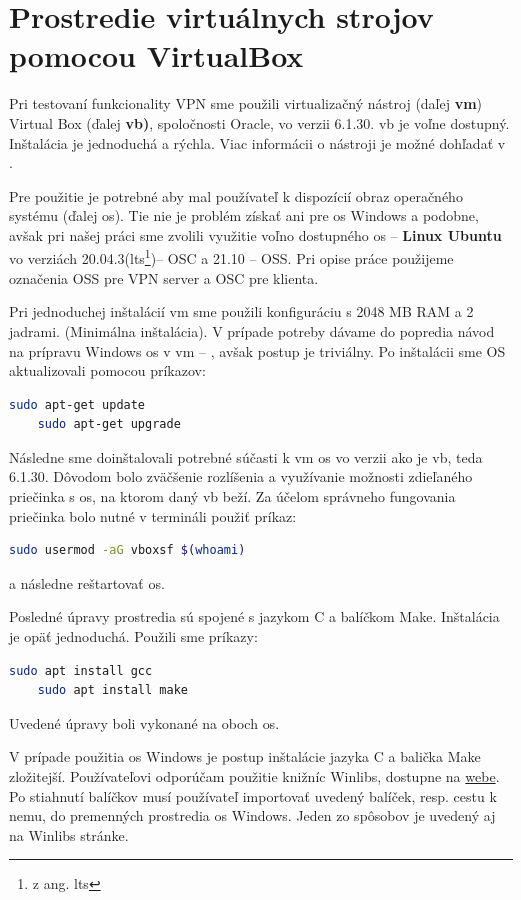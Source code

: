 \chapter{Prostredie virtuálnych strojov pomocou VirtualBox}\label{merania}
Pri testovaní funkcionality VPN sme použili virtualizačný nástroj (daľej \textbf{\acrshort{vm}}) Virtual Box (ďalej \textbf{\acrshort{vb})}, spoločnosti Oracle, vo verzii 6.1.30. \acrshort{vb} je voľne dostupný. Inštalácia je jednoduchá a rýchla. Viac informácii o nástroji je možné dohľadať v \cite{vbox}.

Pre použitie je potrebné aby mal používateľ k dispozícií obraz operačného systému (ďalej \acrshort{os}). Tie nie je problém získať ani pre \acrshort{os} Windows a podobne, avšak pri našej práci sme zvolili využitie voľno dostupného  \acrshort{os} -- \textbf{Linux Ubuntu} vo verziách 20.04.3(\acrshort{lts}\footnote{z ang. \acrlong{lts}})-- OSC a 21.10 -- OSS. Pri opise práce použijeme označenia OSS pre VPN server a OSC pre klienta.

Pri jednoduchej inštalácií \acrshort{vm} sme použili konfiguráciu s  2048 MB RAM a 2 jadrami. (Minimálna inštalácia). V prípade potreby dávame do popredia návod na prípravu Windows \acrshort{os} v \acrshort{vm} -- \cite{vmkonfig}, avšak postup je triviálny. Po inštalácii sme OS aktualizovali pomocou príkazov:
\begin{lstlisting}[language=bash]
	sudo apt-get update
	sudo apt-get upgrade
\end{lstlisting}
Následne sme doinštalovali potrebné súčasti k \acrshort{vm} \acrshort{os} vo verzii ako je \acrshort{vb}, teda 6.1.30. Dôvodom bolo zväčšenie rozlíšenia a využívanie možnosti zdieľaného priečinka s \acrshort{os}, na ktorom daný \acrshort{vb} beží. Za účelom správneho fungovania priečinka bolo nutné v termináli použiť príkaz:
\begin{lstlisting}[language=bash]
	sudo usermod -aG vboxsf $(whoami)
\end{lstlisting}
a následne reštartovať \acrshort{os}.

Posledné úpravy prostredia sú spojené s jazykom C a balíčkom Make. Inštalácia je opäť jednoduchá. Použili sme príkazy:
\begin{lstlisting}[language=bash]
	sudo apt install gcc
	sudo apt install make
\end{lstlisting}
Uvedené úpravy boli vykonané na oboch \acrshort{os}.

V prípade použitia \acrshort{os} Windows je postup inštalácie jazyka C a balička Make zložitejší. Používateľovi odporúčam použitie knižníc Winlibs, dostupne na \href{https://winlibs.com/}{webe}. Po stiahnutí balíčkov musí používateľ importovať uvedený balíček, resp. cestu k nemu, do premenných prostredia \acrshort{os} Windows. Jeden zo spôsobov je uvedený aj na Winlibs stránke. 

